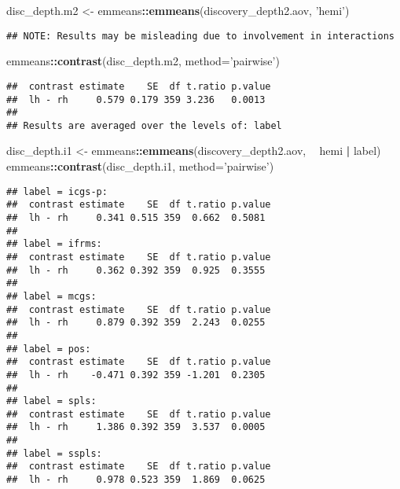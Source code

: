 \documentclass[
]{article}
\newenvironment{Shaded}{\begin{snugshade}}{\end{snugshade}}
\newcommand{\DataTypeTok}[1]{\textcolor[rgb]{0.13,0.29,0.53}{#1}}
\newcommand{\KeywordTok}[1]{\textcolor[rgb]{0.13,0.29,0.53}{\textbf{#1}}}
\newcommand{\NormalTok}[1]{#1}
\newcommand{\OperatorTok}[1]{\textcolor[rgb]{0.81,0.36,0.00}{\textbf{#1}}}
\newcommand{\StringTok}[1]{\textcolor[rgb]{0.31,0.60,0.02}{#1}}
\begin{document}
\begin{Shaded}
\begin{Highlighting}[]
\NormalTok{disc_depth.m2 <-}\StringTok{ }\NormalTok{emmeans}\OperatorTok{::}\KeywordTok{emmeans}\NormalTok{(discovery_depth2.aov, }\StringTok{'hemi'}\NormalTok{)}
\end{Highlighting}
\end{Shaded}

\begin{verbatim}
## NOTE: Results may be misleading due to involvement in interactions
\end{verbatim}

\begin{Shaded}
\begin{Highlighting}[]
\NormalTok{emmeans}\OperatorTok{::}\KeywordTok{contrast}\NormalTok{(disc_depth.m2, }\DataTypeTok{method=}\StringTok{'pairwise'}\NormalTok{)}
\end{Highlighting}
\end{Shaded}

\begin{verbatim}
##  contrast estimate    SE  df t.ratio p.value
##  lh - rh     0.579 0.179 359 3.236   0.0013 
## 
## Results are averaged over the levels of: label
\end{verbatim}

\begin{Shaded}
\begin{Highlighting}[]
\NormalTok{disc_depth.i1 <-}\StringTok{ }\NormalTok{emmeans}\OperatorTok{::}\KeywordTok{emmeans}\NormalTok{(discovery_depth2.aov, }\OperatorTok{~}\StringTok{ }\NormalTok{hemi }\OperatorTok{|}\StringTok{ }\NormalTok{label)}
\NormalTok{emmeans}\OperatorTok{::}\KeywordTok{contrast}\NormalTok{(disc_depth.i1, }\DataTypeTok{method=}\StringTok{'pairwise'}\NormalTok{)}
\end{Highlighting}
\end{Shaded}

\begin{verbatim}
## label = icgs-p:
##  contrast estimate    SE  df t.ratio p.value
##  lh - rh     0.341 0.515 359  0.662  0.5081 
## 
## label = ifrms:
##  contrast estimate    SE  df t.ratio p.value
##  lh - rh     0.362 0.392 359  0.925  0.3555 
## 
## label = mcgs:
##  contrast estimate    SE  df t.ratio p.value
##  lh - rh     0.879 0.392 359  2.243  0.0255 
## 
## label = pos:
##  contrast estimate    SE  df t.ratio p.value
##  lh - rh    -0.471 0.392 359 -1.201  0.2305 
## 
## label = spls:
##  contrast estimate    SE  df t.ratio p.value
##  lh - rh     1.386 0.392 359  3.537  0.0005 
## 
## label = sspls:
##  contrast estimate    SE  df t.ratio p.value
##  lh - rh     0.978 0.523 359  1.869  0.0625
\end{verbatim}
\end{document}
